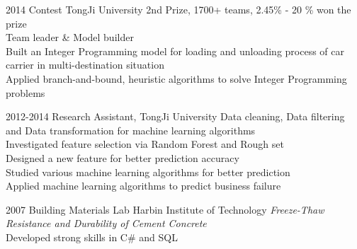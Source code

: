 \documentclass[]{friggeri-cv} %
\begin{document}
\begin{entrylist}
\entry
{2014}
{Contest }
{TongJi University}
{2nd Prize, 1700+ teams, 2.45\% - 20 \% won the prize\\
Team leader \& Model builder \\
Built an Integer Programming model for loading and unloading process of car carrier in multi-destination situation\\
Applied branch-and-bound, heuristic algorithms to solve Integer Programming problems
}

\entry
{2012-2014}
{Research Assistant, }
{TongJi University}
{Data cleaning, Data filtering and Data transformation for machine learning algorithms\\
 Investigated feature selection via Random Forest and Rough set\\
 Designed a new feature for better prediction accuracy\\
 Studied various machine learning algorithms for better prediction\\
 Applied machine learning algorithms to predict business failure
}





\entry
{2007}
{Building Materials Lab}
{Harbin Institute of Technology}
{\emph{Freeze-Thaw Resistance and Durability of Cement Concrete}\\
Developed strong skills in C\# and SQL\\
}


\end{entrylist}
\end{document}
